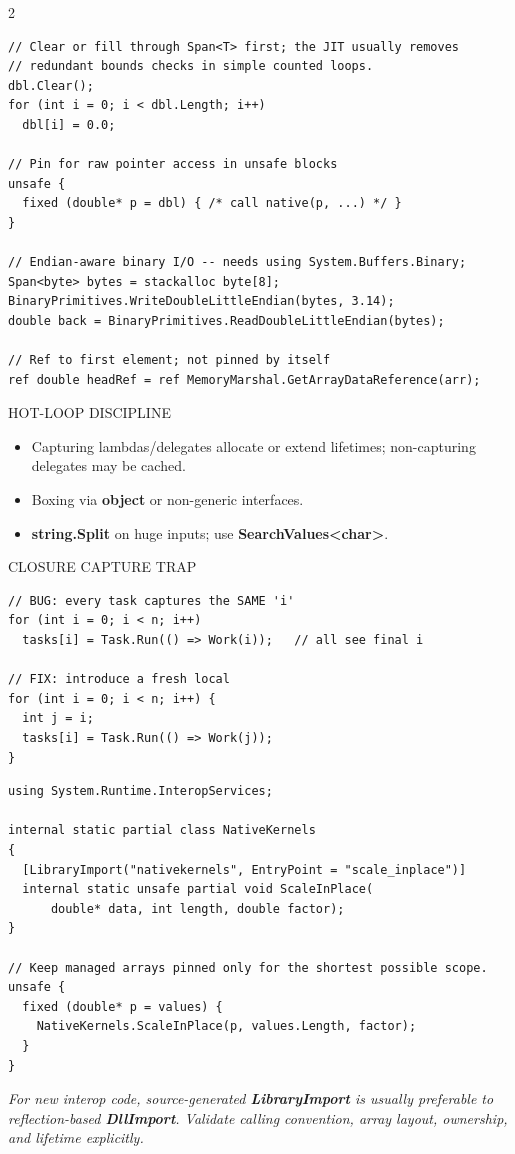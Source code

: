 \documentclass[9pt,a4paper]{extarticle}
\newenvironment{card}[3][acBlue]{%
  \begin{tcolorbox}[
    enhanced, colback=#2, colframe=bdCard,
    coltitle=black, colbacktitle=#2!70!bgHdr,
    fonttitle=\bfseries\fontsize{6.16pt}{7.48pt}\selectfont\MakeUppercase,
    title={#3},
    left=3pt, right=2pt, top=1.4pt, bottom=1.8pt,
    toptitle=1pt, bottomtitle=1pt,
    boxrule=0.4pt,
    borderline west={3pt}{0pt}{#1},
    arc=2pt, before skip=0pt, after skip=1.6mm,
    breakable, toprule at break=0pt, bottomrule at break=0pt,
  ]}{\end{tcolorbox}}
\newcommand{\sub}[1]{%
  \par\vspace{1.5pt}%
  {\fontsize{5.7pt}{7pt}\selectfont\color{gray}\MakeUppercase{#1}}\par
  \vspace{0.5pt}}
\newcommand{\code}[1]{{\ttfamily\bfseries #1}}
\newcommand{\note}[1]{\par\noindent
  \begin{minipage}{\linewidth}%
  {\fontsize{5.6pt}{6.8pt}\selectfont\itshape #1}%
  \end{minipage}\par}
\begin{document}
\begin{multicols}{2}
\begin{card}[acPurple]{bgPurple}{MemoryMarshal, Pointers \& Binary I/O}
\begin{lstlisting}[style=cs]
// Clear or fill through Span<T> first; the JIT usually removes
// redundant bounds checks in simple counted loops.
dbl.Clear();
for (int i = 0; i < dbl.Length; i++)
  dbl[i] = 0.0;

// Pin for raw pointer access in unsafe blocks
unsafe {
  fixed (double* p = dbl) { /* call native(p, ...) */ }
}

// Endian-aware binary I/O -- needs using System.Buffers.Binary;
Span<byte> bytes = stackalloc byte[8];
BinaryPrimitives.WriteDoubleLittleEndian(bytes, 3.14);
double back = BinaryPrimitives.ReadDoubleLittleEndian(bytes);

// Ref to first element; not pinned by itself
ref double headRef = ref MemoryMarshal.GetArrayDataReference(arr);
\end{lstlisting}
\sub{Hot-loop discipline}
\begin{itemize}
\item Capturing lambdas/delegates allocate or extend lifetimes; non-capturing delegates may be cached.
\item Boxing via \code{object} or non-generic interfaces.
\item \code{string.Split} on huge inputs; use \code{SearchValues<char>}.
\end{itemize}
\sub{Closure capture trap}
\begin{lstlisting}[style=cs]
// BUG: every task captures the SAME 'i'
for (int i = 0; i < n; i++)
  tasks[i] = Task.Run(() => Work(i));   // all see final i

// FIX: introduce a fresh local
for (int i = 0; i < n; i++) {
  int j = i;
  tasks[i] = Task.Run(() => Work(j));
}
\end{lstlisting}
\end{card}


\begin{card}[acBlue]{bgBlue}{Native Interop: Keep Boundaries Explicit}
\begin{lstlisting}[style=cs]
using System.Runtime.InteropServices;

internal static partial class NativeKernels
{
  [LibraryImport("nativekernels", EntryPoint = "scale_inplace")]
  internal static unsafe partial void ScaleInPlace(
      double* data, int length, double factor);
}

// Keep managed arrays pinned only for the shortest possible scope.
unsafe {
  fixed (double* p = values) {
    NativeKernels.ScaleInPlace(p, values.Length, factor);
  }
}
\end{lstlisting}
\note{For new interop code, source-generated \code{LibraryImport} is usually
preferable to reflection-based \code{DllImport}. Validate calling convention,
array layout, ownership, and lifetime explicitly.}
\end{card}
\end{multicols}
\end{document}
